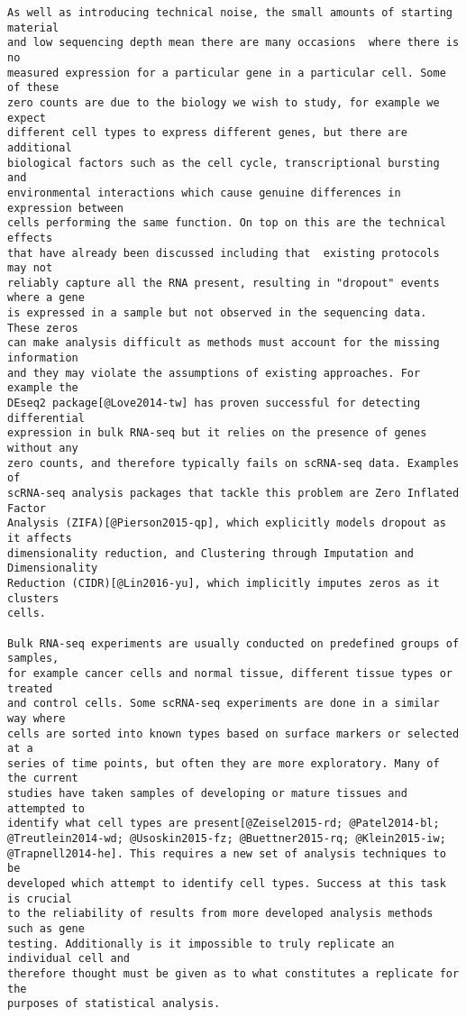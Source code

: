 \documentclass[11pt,a4paper,titlepage,twoside,openright]{style/unimelbthesis}
\theoremstyle{definition}
\theoremstyle{definition}
\theoremstyle{definition}
\theoremstyle{remark}
\begin{document}
\begin{mainmatter}
\begin{verbatim}
As well as introducing technical noise, the small amounts of starting material
and low sequencing depth mean there are many occasions  where there is no
measured expression for a particular gene in a particular cell. Some of these
zero counts are due to the biology we wish to study, for example we expect
different cell types to express different genes, but there are additional
biological factors such as the cell cycle, transcriptional bursting and
environmental interactions which cause genuine differences in expression between
cells performing the same function. On top on this are the technical effects
that have already been discussed including that  existing protocols may not
reliably capture all the RNA present, resulting in "dropout" events where a gene
is expressed in a sample but not observed in the sequencing data. These zeros
can make analysis difficult as methods must account for the missing information
and they may violate the assumptions of existing approaches. For example the
DEseq2 package[@Love2014-tw] has proven successful for detecting differential
expression in bulk RNA-seq but it relies on the presence of genes without any
zero counts, and therefore typically fails on scRNA-seq data. Examples of
scRNA-seq analysis packages that tackle this problem are Zero Inflated Factor
Analysis (ZIFA)[@Pierson2015-qp], which explicitly models dropout as it affects
dimensionality reduction, and Clustering through Imputation and Dimensionality
Reduction (CIDR)[@Lin2016-yu], which implicitly imputes zeros as it clusters
cells.

Bulk RNA-seq experiments are usually conducted on predefined groups of samples,
for example cancer cells and normal tissue, different tissue types or treated
and control cells. Some scRNA-seq experiments are done in a similar way where
cells are sorted into known types based on surface markers or selected at a
series of time points, but often they are more exploratory. Many of the current
studies have taken samples of developing or mature tissues and attempted to
identify what cell types are present[@Zeisel2015-rd; @Patel2014-bl;
@Treutlein2014-wd; @Usoskin2015-fz; @Buettner2015-rq; @Klein2015-iw;
@Trapnell2014-he]. This requires a new set of analysis techniques to be
developed which attempt to identify cell types. Success at this task is crucial
to the reliability of results from more developed analysis methods such as gene
testing. Additionally is it impossible to truly replicate an individual cell and
therefore thought must be given as to what constitutes a replicate for the
purposes of statistical analysis.
\end{verbatim}


\end{mainmatter}
\end{document}
